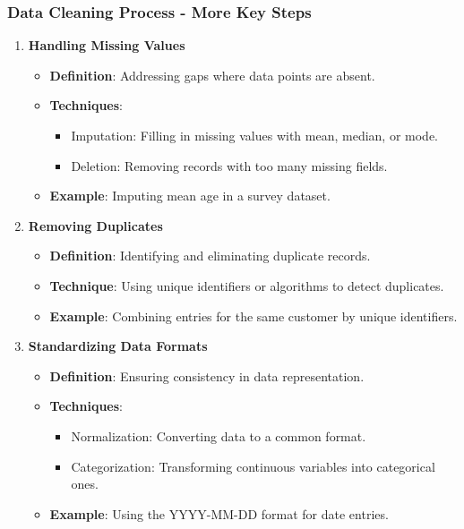 \documentclass[aspectratio=169]{beamer}
\begin{document}
\begin{frame}[fragile]
    \frametitle{Data Cleaning Process - More Key Steps}
    \begin{enumerate}[resume]
        \item \textbf{Handling Missing Values}
            \begin{itemize}
                \item \textbf{Definition}: Addressing gaps where data points are absent.
                \item \textbf{Techniques}:
                    \begin{itemize}
                        \item Imputation: Filling in missing values with mean, median, or mode.
                        \item Deletion: Removing records with too many missing fields.
                    \end{itemize}
                \item \textbf{Example}: Imputing mean age in a survey dataset.
            \end{itemize}

        \item \textbf{Removing Duplicates}
            \begin{itemize}
                \item \textbf{Definition}: Identifying and eliminating duplicate records.
                \item \textbf{Technique}: Using unique identifiers or algorithms to detect duplicates.
                \item \textbf{Example}: Combining entries for the same customer by unique identifiers.
            \end{itemize}

        \item \textbf{Standardizing Data Formats}
            \begin{itemize}
                \item \textbf{Definition}: Ensuring consistency in data representation.
                \item \textbf{Techniques}:
                    \begin{itemize}
                        \item Normalization: Converting data to a common format.
                        \item Categorization: Transforming continuous variables into categorical ones.
                    \end{itemize}
                \item \textbf{Example}: Using the YYYY-MM-DD format for date entries.
            \end{itemize}
    \end{enumerate}
\end{frame}
\end{document}
